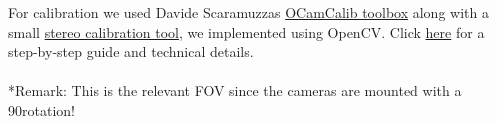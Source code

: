 For calibration we used Davide Scaramuzzas
\href{https://sites.google.com/site/scarabotix/ocamcalib-toolbox}{OCamCalib toolbox} along with a small
\href{https://github.com/ands/OculusMeetsAR/tree/master/Hardware}{stereo calibration tool}, we implemented using OpenCV. Click
\href{https://github.com/ands/OculusMeetsAR/wiki/Calibration}{here} for a step-by-step guide and technical details.
\\
\\
*Remark: This is the relevant FOV since the cameras are mounted with a 90\textdegree rotation!